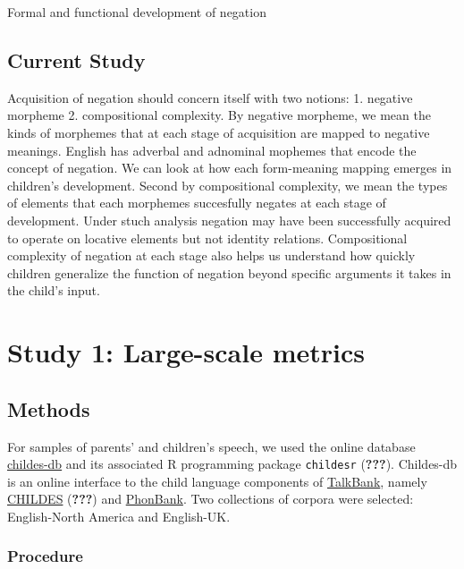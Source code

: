 \documentclass[man]{apa6}
\begin{document}
Formal and functional development of negation

\subsection{Current Study}\label{current-study}

Acquisition of negation should concern itself with two notions: 1.
negative morpheme 2. compositional complexity. By negative morpheme, we
mean the kinds of morphemes that at each stage of acquisition are mapped
to negative meanings. English has adverbal and adnominal mophemes that
encode the concept of negation. We can look at how each form-meaning
mapping emerges in children's development. Second by compositional
complexity, we mean the types of elements that each morphemes
succesfully negates at each stage of development. Under stuch analysis
negation may have been successfully acquired to operate on locative
elements but not identity relations. Compositional complexity of
negation at each stage also helps us understand how quickly children
generalize the function of negation beyond specific arguments it takes
in the child's input.

\section{Study 1: Large-scale
metrics}\label{study-1-large-scale-metrics}

\subsection{Methods}\label{methods}

For samples of parents' and children's speech, we used the online
database \href{childes-db.stanford.edu}{childes-db} and its associated R
programming package \texttt{childesr} ({\textbf{???}}). Childes-db is an
online interface to the child language components of
\href{https://talkbank.org/}{TalkBank}, namely
\href{https://childes.talkbank.org/}{CHILDES} ({\textbf{???}}) and
\href{https://phonbank.talkbank.org/}{PhonBank}. Two collections of
corpora were selected: English-North America and English-UK.

\subsubsection{Procedure}\label{procedure}
\end{document}
